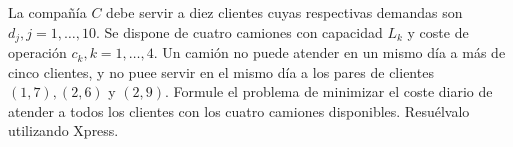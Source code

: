 \documentclass[twoside]{article}
\begin{document}
\newpage

\begin{ejercicio}{3}
La compañía $C$ debe servir a diez clientes cuyas respectivas demandas son $d_j, j=1,\dots,10$. Se dispone de cuatro camiones con capacidad $L_k$ y coste de operación $c_k,k=1,\dots,4$. Un camión no puede atender en un mismo día a más de cinco clientes, y no puee servir en el mismo día a los pares de clientes $(1,7),(2,6)$ y $(2,9)$. Formule el problema de minimizar el coste diario de atender a todos los clientes con los cuatro camiones disponibles. Resuélvalo utilizando Xpress.
\end{ejercicio}
\begin{solucion}


\end{solucion}
\end{document}
